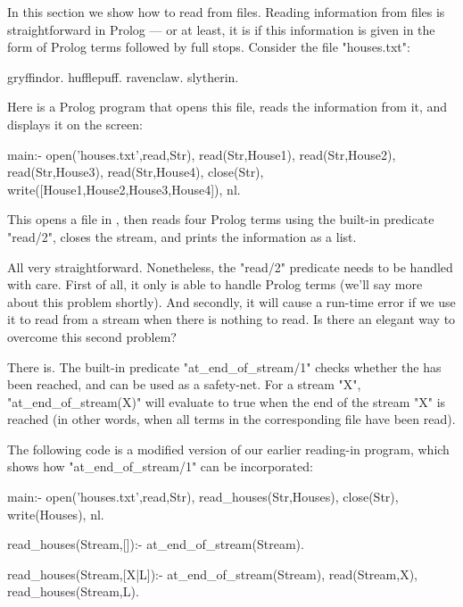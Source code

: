 In this section we show how to read from files.  Reading information
from files is straightforward in Prolog --- or at least, it is if this
information is given in the form of Prolog terms followed
by full stops. Consider the file "houses.txt":

\begin{LPNcodedisplay}
gryffindor.
hufflepuff.
ravenclaw.
slytherin.
\end{LPNcodedisplay}
Here is a Prolog program that opens this file, reads
the information from it, and displays it on the screen:

\begin{LPNcodedisplay}
main:-
   open('houses.txt',read,Str),
   read(Str,House1),
   read(Str,House2),
   read(Str,House3),
   read(Str,House4),
   close(Str),
   write([House1,House2,House3,House4]), nl.
\end{LPNcodedisplay}
This opens a file in , then reads
four Prolog terms using the built-in predicate "read/2",
closes the stream, and prints the information as a list.

All very straightforward. Nonetheless, the "read/2" predicate needs to
be handled with care. First of all, it only is able to handle Prolog
terms (we'll say more about this problem shortly). And secondly, it
will cause a run-time error if we use it to read from a stream when
there is nothing to read. Is there an elegant way to overcome this
second problem?

There is. The built-in predicate "at\_end\_of\_stream/1" checks whether
the  has been reached, and can be
used as a safety-net.  For a stream "X", "at\_end\_of\_stream(X)"
will
evaluate to true  when the end of the stream "X" is reached (in other
words, when all terms in the corresponding file have been read).

The following code is a modified version of our earlier reading-in
program, which shows how "at\_end\_of\_stream/1" can be incorporated:

\begin{LPNcodedisplay}
main:-
   open('houses.txt',read,Str),
   read_houses(Str,Houses),
   close(Str),
   write(Houses), nl.

read_houses(Stream,[]):-
   at_end_of_stream(Stream).

read_houses(Stream,[X|L]):-
   \+ at_end_of_stream(Stream),
   read(Stream,X),
   read_houses(Stream,L).
\end{LPNcodedisplay}

